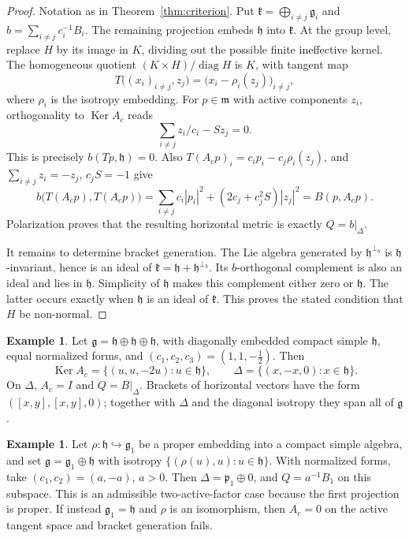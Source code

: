 \documentclass[12pt]{amsart}
\theoremstyle{plain}
\theoremstyle{definition}
\newtheorem{example}[theorem]{Example}
\theoremstyle{remark}
\newcommand{\alg}[1]{\mathfrak{#1}}
\newcommand{\Ker}{\operatorname{Ker}}
\newcommand{\diag}{\operatorname{diag}}
\begin{document}
\begin{proof}
Notation as in Theorem~\ref{thm:criterion}. Put $\alg{k}=\bigoplus_{i\neq j}\alg{g}_i$ and
$b=\sum_{i\neq j}c_i^{-1}B_i$. The remaining projection embeds $\alg{h}$ into $\alg{k}$. At the
group level, replace $H$ by its image in $K$, dividing out the possible finite ineffective kernel.
The homogeneous quotient $(K\times H)/\diag H$ is $K$, with tangent map
\[ T\big((x_i)_{i\neq j},z_j\big)=\big(x_i-\rho_i(z_j)\big)_{i\neq j}, \]
where $\rho_i$ is the isotropy embedding. For $p\in\alg{m}$ with active
components $z_i$, orthogonality to $\Ker A_c$ reads
\[ \sum_{i\neq j}z_i/c_i-Sz_j=0. \]
This is precisely $b(Tp,\alg{h})=0$. Also $T(A_cp)_i=c_ip_i-c_j\rho_i(z_j)$, and
$\sum_{i\neq j}z_i=-z_j$, $c_jS=-1$ give
\[ b\big(T(A_cp),T(A_cp)\big)=\sum_{i\neq j}c_i|p_i|^2+(2c_j+c_j^2S)|z_j|^2=B(p,A_cp). \]
Polarization proves that the resulting horizontal metric is exactly $Q=b|_{\Delta}$.

It remains to determine bracket generation. The Lie algebra generated by $\alg{h}^{\perp_b}$ is
$\alg{h}$-invariant, hence is an ideal of $\alg{k}=\alg{h}+\alg{h}^{\perp_b}$. Its
$b$-orthogonal complement is also an ideal and lies in $\alg{h}$. Simplicity of $\alg{h}$ makes
this complement either zero or $\alg{h}$. The latter occurs exactly when $\alg{h}$ is an ideal of
$\alg{k}$. This proves the stated condition that $H$ be non-normal.
\end{proof}

\begin{example}\label{ex:three}
Let $\alg{g}=\alg{h}\oplus\alg{h}\oplus\alg{h}$, with diagonally embedded compact simple $\alg{h}$,
equal normalized forms, and $(c_1,c_2,c_3)=(1,1,-\tfrac12)$. Then
\[ \Ker A_c=\{(u,u,-2u):u\in\alg{h}\},\qquad \Delta=\{(x,-x,0):x\in\alg{h}\}. \]
On $\Delta$, $A_c=I$ and $Q=B|_{\Delta}$. Brackets of horizontal vectors have the form
$([x,y],[x,y],0)$; together with $\Delta$ and the diagonal isotropy they span all of $\alg{g}$.
\end{example}

\begin{example}\label{ex:two}
Let $\rho:\alg{h}\hookrightarrow\alg{g}_1$ be a proper embedding into a compact simple algebra,
and set $\alg{g}=\alg{g}_1\oplus\alg{h}$ with isotropy $\{(\rho(u),u):u\in\alg{h}\}$. With
normalized forms, take $(c_1,c_2)=(a,-a)$, $a>0$. Then $\Delta=\alg{p}_1\oplus0$, and
$Q=a^{-1}B_1$ on this subspace. This is an admissible two-active-factor case because the first
projection is proper. If instead $\alg{g}_1=\alg{h}$ and $\rho$ is an isomorphism, then $A_c=0$ on
the active tangent space and bracket generation fails.
\end{example}
\end{document}
